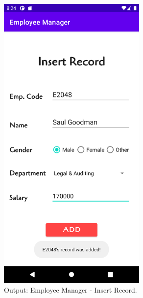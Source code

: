 \documentclass[12pt, a4]{article}
\begin{document}
\subsection*{}
\begin{figure}[h]
\centering
\caption{Output: Employee Manager - Insert Record.}
\includegraphics[height=15cm, width=7.3cm]{EmployeeManager/Screenshots/Output-2.png}
\end{figure}

\newpage
\end{document}
